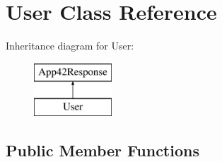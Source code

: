 \hypertarget{class_user}{\section{User Class Reference}
\label{class_user}
}
Inheritance diagram for User\+:\begin{figure}[H]
\begin{center}
\leavevmode
\includegraphics[height=2.000000cm]{class_user}
\end{center}
\end{figure}
\subsection*{Public Member Functions}
